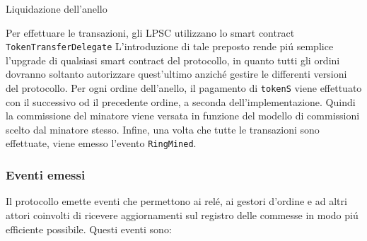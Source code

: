 \documentclass[UTF8,nofonts]{article}
\makeatletter
\newenvironment{figurehere}
 {\def\@captype{figure}}
 {}
\makeatother
\begin{document}
\begin{multicols}{2}
\begin{center}
\begin{figurehere}
\centering
{}
\caption{Liquidazione dell'anello}
\label{fig:settlement}
\end{figurehere}
\end{center}

Per effettuare le transazioni, gli LPSC utilizzano lo smart contract \verb|TokenTransferDelegate| L'introduzione di tale preposto rende pi\'u semplice l'upgrade di qualsiasi smart contract del protocollo, in quanto tutti gli ordini dovranno soltanto autorizzare quest'ultimo anzich\'e gestire le differenti versioni del protocollo.
Per ogni ordine dell'anello, il pagamento di \verb|tokenS| viene effettuato con il successivo od il precedente ordine, a seconda dell'implementazione. Quindi la commissione del minatore viene versata in funzione del modello di commissioni scelto dal minatore stesso. Infine, una volta che tutte le transazioni sono effettuate, viene emesso l'evento \verb|RingMined|.

\subsubsection{Eventi emessi\label{sec:events}}

Il protocollo emette eventi che permettono ai rel\'e, ai gestori d'ordine e ad altri attori coinvolti di ricevere aggiornamenti sul registro delle commesse in modo pi\'u efficiente possibile. Questi eventi sono:


\end{multicols}
\end{document}

